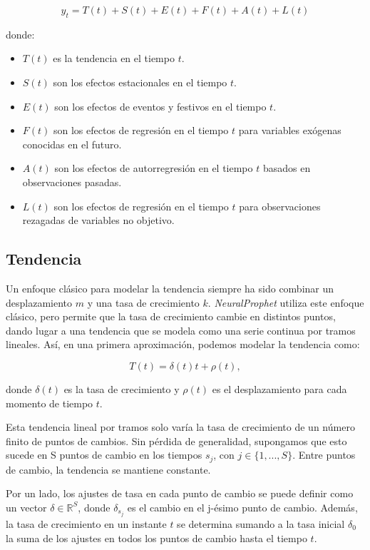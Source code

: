 \documentclass[12pt,twoside]{article}
\begin{document}
\begin{equation}
\hat{y}_t = T(t) + S(t) + E(t) + F(t) + A(t) + L(t)
\end{equation}

donde:

\begin{itemize}
    \item $T(t)$ es la tendencia en el tiempo $t$.
    \item $S(t)$ son los efectos estacionales en el tiempo $t$.
    \item $E(t)$ son los efectos de eventos y festivos en el tiempo $t$.
    \item $F(t)$ son los efectos de regresión en el tiempo $t$ para variables exógenas conocidas en el futuro.
    \item $A(t)$ son los efectos de autorregresión en el tiempo $t$ basados en observaciones pasadas.
    \item $L(t)$ son los efectos de regresión en el tiempo $t$ para observaciones rezagadas de variables no objetivo.
\end{itemize}

\subsection{Tendencia}\label{sec:22}

Un enfoque clásico para modelar la tendencia siempre ha sido combinar un desplazamiento $m$ y una tasa de crecimiento $k$. \textit{NeuralProphet} utiliza este enfoque clásico, pero permite que la tasa de crecimiento cambie en distintos puntos, dando lugar a una tendencia que se modela como una serie continua por tramos lineales. Así, en una primera aproximación, podemos modelar la tendencia como: 

\begin{equation}
T(t) = \delta(t)t + \rho(t),
\label{eq:eq1}
\end{equation}

donde $\delta(t)$ es la tasa de crecimiento y $\rho(t)$ es el desplazamiento para cada momento de tiempo $t$.

Esta tendencia lineal por tramos solo varía la tasa de crecimiento de un número finito de puntos de cambios. Sin pérdida de generalidad, supongamos que esto sucede en S puntos de cambio en los tiempos $s_j$, con $j\in \{1,...,S\}$. Entre puntos de cambio, la tendencia se mantiene constante. 

Por un lado, los ajustes de tasa en cada punto de cambio se puede definir como un vector $\delta \in \mathbb{R}^S$, donde $\delta_{s_j}$ es el cambio en el j-ésimo punto de cambio. Además, la tasa de crecimiento en un instante $t$ se determina sumando a la tasa inicial $\delta_0$ la suma de los ajustes en todos los puntos de cambio hasta el tiempo $t$.
\end{document}
